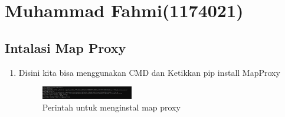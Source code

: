\section{Muhammad Fahmi(1174021)}
\subsection{Intalasi Map Proxy}
\begin{enumerate}
    \item Disini kita bisa menggunakan CMD dan Ketikkan pip install MapProxy
    \hfill\break
    \begin{figure}[H]
		\includegraphics[width=4cm]{figures/1174021/5/1.png}
		\centering
		\caption{Perintah untuk menginstal map proxy}
    \end{figure}
\end{enumerate}


